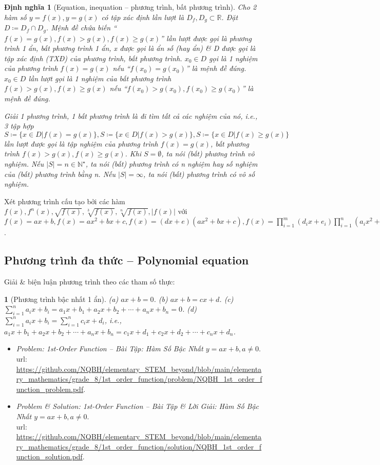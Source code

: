 \documentclass{article}
\newtheorem{baitoan}{}
\newtheorem{dinhnghia}{Định nghĩa}
\begin{document}
\begin{dinhnghia}[Equation, inequation -- phương trình, bất phương trình]
	Cho 2 hàm số $y = f(x),y = g(x)$ có tập xác định lần lượt là $D_f,D_g\subset\mathbb{R}$. Đặt $D\coloneqq D_f\cap D_g$. Mệnh đề chứa biến ``$f(x) = g(x),f(x) > g(x),f(x)\ge g(x)$'' lần lượt được gọi là {\rm phương trình 1 ẩn, bất phương trình 1 ẩn}, x được gọi là {\rm ẩn số} (hay {\rm ẩn}) \& D được gọi là {\rm tập xác định (TXĐ)} của phương trình, bất phương trình. $x_0\in D$ gọi là 1 {\rm nghiệm} của phương trình $f(x) = g(x)$ nếu ``$f(x_0) = g(x_0)$'' là mệnh đề đúng. $x_0\in D$ lần lượt gọi là 1 {\rm nghiệm} của bất phương trình $f(x) > g(x),f(x)\ge g(x)$ nếu ``$f(x_0) > g(x_0),f(x_0)\ge g(x_0)$'' là mệnh đề đúng.
	
	{\rm Giải} 1 phương trình, 1 bất phương trình là đi tìm tất cả các nghiệm của nó, i.e., 3 tập hợp $S\coloneqq\{x\in D|f(x) = g(x)\},S\coloneqq\{x\in D|f(x) > g(x)\},S\coloneqq\{x\in D|f(x)\ge g(x)\}$ lần lượt được gọi là {\rm tập nghiệm} của phương trình $f(x) = g(x)$, bất phương trình $f(x) > g(x),f(x)\ge g(x)$. Khi $S = \emptyset$, ta nói (bất) phương trình {\rm vô nghiệm}. Nếu $|S| = n\in\mathbb{N}^\star$, ta nói (bất) phương trình có n nghiệm hay số nghiệm của (bất) phương trình bằng n. Nếu $|S| = \infty$, ta nói (bất) phương trình có vô số nghiệm.
\end{dinhnghia}
Xét phương trình cấu tạo bởi các hàm $f(x),f^n(x),\sqrt{f(x)},\sqrt[3]{f(x)},\sqrt[n]{f(x)},|f(x)|$ với $f(x) = ax + b,f(x) = ax^2 + bx + c,f(x) = (dx + e)(ax^2 + bx + c),f(x) = \prod_{i=1}^m (d_ix + e_i)\prod_{i=1}^n (a_ix^2 + b_ix + c_i)$.

\subsection{Phương trình đa thức -- Polynomial equation}
Giải \& biện luận phương trình theo các tham số thực:

\begin{baitoan}[Phương trình bậc nhất 1 ẩn]
	(a) $ax + b = 0$. (b) $ax + b = cx + d$. (c) $\sum_{i=1}^n a_ix + b_i = a_1x + b_1 + a_2x + b_2 + \cdots + a_nx + b_n = 0$. (d) $\sum_{i=1}^n a_ix + b_i = \sum_{i=1}^n c_ix + d_i$, i.e., $a_1x + b_1 + a_2x + b_2 + \cdots + a_nx + b_n = c_1x + d_1 + c_2x + d_2 + \cdots + c_nx + d_n$.
\end{baitoan}

\begin{itemize}
	\item \textit{Problem: 1st-Order Function -- Bài Tập: Hàm Số Bậc Nhất $y = ax + b,a\ne0$}.\\{\sc url}: \url{https://github.com/NQBH/elementary_STEM_beyond/blob/main/elementary_mathematics/grade_8/1st_order_function/problem/NQBH_1st_order_function_problem.pdf}.
	\item \textit{Problem \& Solution: 1st-Order Function -- Bài Tập \& Lời Giải: Hàm Số Bậc Nhất $y = ax + b,a\ne0$}.\\{\sc url}: \url{https://github.com/NQBH/elementary_STEM_beyond/blob/main/elementary_mathematics/grade_8/1st_order_function/solution/NQBH_1st_order_function_solution.pdf}.
\end{itemize}
\end{document}
